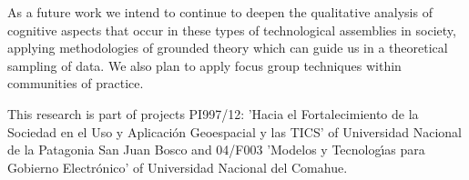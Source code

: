 \documentclass[10pt,twocolumn,ieeetran]{article}
\begin{document}


As a future work we intend to continue to deepen the qualitative analysis of cognitive aspects that occur in these types of technological assemblies in society, applying methodologies of grounded theory which can guide us in a theoretical sampling of data. We also plan to apply focus group techniques within communities of practice.



\noindent This research is part of projects  PI997/12: 'Hacia el Fortalecimiento de la Sociedad en el Uso y Aplicaci\' on Geoespacial y las TICS' of Universidad Nacional de la Patagonia San Juan Bosco and 04/F003 'Modelos y Tecnolog\' {\i}as para Gobierno Electr\' onico' of Universidad Nacional del Comahue.



\end{document}
